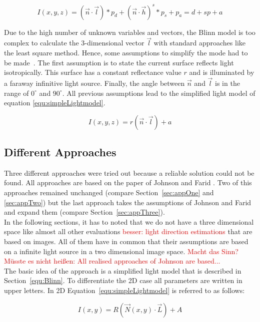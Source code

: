 \begin{equation}
\label{equ:Blinn}
I(x,y,z) = (\vec{n}\cdot \vec{l})*p_d + (\vec{n}\cdot\vec{h})^s*p_s + p_a = d + sp + a
\end{equation} 

Due to the high number of unknown variables and vectors, the Blinn model is too complex to calculate the 3-dimensional vector $\vec{l}$ with standard approaches like the least square method. Hence, some assumptions to simplify the mode had to be made~\cite{Johnson}. The first assumption is to state the current surface reflects light isotropically. This surface has a constant reflectance value $r$ and is illuminated by a faraway infinitive light source. Finally, the angle between $\vec{n}$ and  $\vec{l}$ is in the range of $0^\circ $ and $90^\circ$. All previous assumptions lead to the simplified light model of equation \ref{equ:simpleLightmodel}.

\begin{equation}
\label{equ:simpleLightmodel}
I(x,y,z) = r(\vec{n}\cdot \vec{l}) + a
\end{equation} 

\subsection{Different Approaches}\label{sec:approaches}
Three different approaches were tried out because a reliable solution could not be found. All approaches are based on the paper of Johnson and Farid \cite{Johnson}. 
Two of this approaches remained unchanged (compare Section~\ref{sec:appOne} and \ref{sec:appTwo}) but the last approach takes the assumptions of Johnson and Farid and expand them (compare Section~\ref{sec:appThree}). \\
In the following sections, it has to noted that we do not have a three dimensional space like almost all other evaluations \textcolor{red}{besser: light direction estimations} that are based on images. All of them have in common that their assumptions are based on a infinite light source in a two dimensional image space. \textcolor{red}{Macht das Sinn? Müsste es nicht heißen: All realised approaches of Johnson are based...}\\
The basic idea of the approach is a simplified light model that is described in Section~\ref{equ:Blinn}. To differentiate the 2D case all parameters are written in upper letters. In 2D Equation~\ref{equ:simpleLightmodel} is referred to as follows:

\begin{equation}
\label{equ:General}
I(x,y) = R(\vec{N}(x,y)\cdot \vec{L}) + A
\end{equation}


